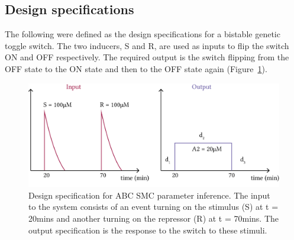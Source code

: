 \begin{table}[t]
\centering
\caption{The prior distributions used for the standard toggle switch parameter inference. The values indicate the lower and upper limits (inclusive) of a uniform distribution.}
\label{tab:param_inf_params}
\centerfloat
{}
\end{table}

\subsection{Design specifications}

The following were defined as the design specifications for a bistable genetic toggle switch. The two inducers, S and R, are used as inputs to flip the switch ON and OFF respectively. The required output is the switch flipping from the OFF state to the ON state and then to the OFF state again (Figure~\ref{fig:abc_behav}). 


\begin{figure}[htbp]
	\begin{center}
\includegraphics[scale=0.7]{../../chapters/chapterABCSysBio/images/behaviour.png}
\caption[Design specification for ABC SMC parameter inference]{\label{fig:abc_behav}Design specification for ABC SMC parameter inference. The input to the system consists of an event turning on the stimulus (S) at t = 20mins and another turning on the repressor (R) at t = 70mins. The output specification is the response to the switch to these stimuli.}
\end{center}
\end{figure}

